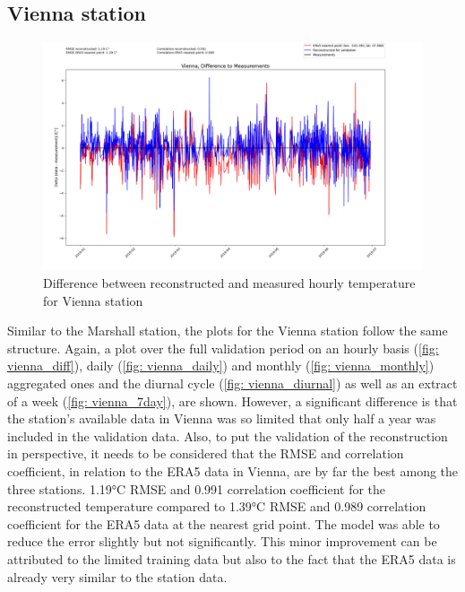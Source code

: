 \subsection*{Vienna station}
\begin{figure}[H]
\centering
\includegraphics[width=1.00\textwidth]{resources/images/charts/vienna_eval_grib_final/Vienna, Difference to Measurements.png}
\caption{Difference between reconstructed and measured hourly temperature for Vienna station}
\label{fig: vienna_diff}
\end{figure}

Similar to the Marshall station, the plots for the Vienna station follow the same structure.
Again, a plot over the full validation period on an hourly basis (\autoref{fig: vienna_diff}), daily (\autoref{fig: vienna_daily}) and monthly (\autoref{fig: vienna_monthly}) aggregated ones and the diurnal cycle (\autoref{fig: vienna_diurnal}) as well as an extract of a week (\autoref{fig: vienna_7day}), are shown.
However, a significant difference is that the station's available data in Vienna was so limited that only half a year was included in the validation data.
Also, to put the validation of the reconstruction in perspective, it needs to be considered that the RMSE and correlation coefficient, in relation to the ERA5 data in Vienna, are by far the best among the three stations.
1.19°C RMSE and 0.991 correlation coefficient for the reconstructed temperature compared to 1.39°C RMSE and 0.989 correlation coefficient for the ERA5 data at the nearest grid point.
The model was able to reduce the error slightly but not significantly.
This minor improvement can be attributed to the limited training data but also to the fact that the ERA5 data is already very similar to the station data.

